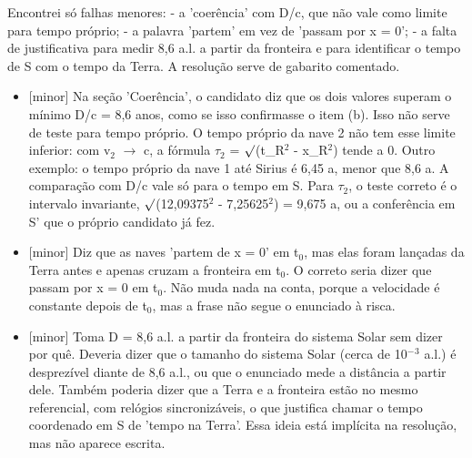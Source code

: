 \documentclass{article}%
\begin{document}
\newline%
Encontrei só falhas menores:\newline%
{-} a 'coerência' com D/c, que não vale como limite para tempo próprio;\newline%
{-} a palavra 'partem' em vez de 'passam por x = 0';\newline%
{-} a falta de justificativa para medir 8,6 a.l. a partir da fronteira e para identificar o tempo de S com o tempo da Terra.\newline%
\newline%
A resolução serve de gabarito comentado.%
\begin{itemize}%
\item%
{[}minor{]} Na seção 'Coerência', o candidato diz que os dois valores superam o mínimo D/c = 8,6 anos, como se isso confirmasse o item (b). Isso não serve de teste para tempo próprio. O tempo próprio da nave 2 não tem esse limite inferior: com v$_{2}$ $\to$ c, a fórmula $\tau$$_{2}$ = $\surd$(t\_R$^2$ - x\_R$^2$) tende a 0. Outro exemplo: o tempo próprio da nave 1 até Sirius é 6,45 a, menor que 8,6 a. A comparação com D/c vale só para o tempo em S. Para $\tau$$_{2}$, o teste correto é o intervalo invariante, $\surd$(12,09375$^2$ - 7,25625$^2$) = 9,675 a, ou a conferência em S' que o próprio candidato já fez.%
\item%
{[}minor{]} Diz que as naves 'partem de x = 0' em t$_{0}$, mas elas foram lançadas da Terra antes e apenas cruzam a fronteira em t$_{0}$. O correto seria dizer que passam por x = 0 em t$_{0}$. Não muda nada na conta, porque a velocidade é constante depois de t$_{0}$, mas a frase não segue o enunciado à risca.%
\item%
{[}minor{]} Toma D = 8,6 a.l. a partir da fronteira do sistema Solar sem dizer por quê. Deveria dizer que o tamanho do sistema Solar (cerca de 10$^{-}$$^3$ a.l.) é desprezível diante de 8,6 a.l., ou que o enunciado mede a distância a partir dele. Também poderia dizer que a Terra e a fronteira estão no mesmo referencial, com relógios sincronizáveis, o que justifica chamar o tempo coordenado em S de 'tempo na Terra'. Essa ideia está implícita na resolução, mas não aparece escrita.%
\end{itemize}%
\end{document}
